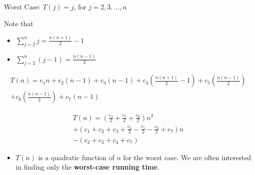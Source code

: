 \begin{frame}{Worst Case: $T(j) = j$, for $j=2, 3, \ldots, n$}

  \begin{block}{Note that}
    \begin{itemize}
      \item $\sum_{j=2}^{n}j = \frac{n(n+1)}{2}-1$
      \item $\sum_{j=2}^{n}(j-1) = \frac{n(n-1)}{2}$
    \end{itemize}
  \end{block}

\end{frame}

\begin{frame}

    \begin{multline*}
    T(n) = c_1n + c_2(n-1) + c_3(n-1) + c_4(\frac{n(n+1)}{2}-1) + c_5(\frac{n(n-1)}{2}) \\ + c_6(\frac{n(n-1)}{2}) + c_7(n-1)
    \end{multline*}

\end{frame}

\begin{frame}

    \begin{multline*}
      T(n) =   (\frac{c_4}{2} + \frac{c_5}{2} + \frac{c_6}{2})n^2 \\
              + (c_1 + c_2 + c_3 + \frac{c_4}{2} - \frac{c_5}{2} - \frac{c_6}{2} + c_7)n \\
              - (c_2 + c_3 + c_4 + c_7) 
    \end{multline*} \pause

    \pause
  
    \begin{itemize}
     \item $T(n)$ is a quadratic function of $n$ for the worst case. \pause
      We are often interested in finding only the {\bf worst-case running time}.
    \end{itemize}
\end{frame}

